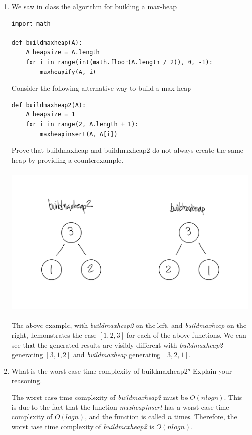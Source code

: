\documentclass[12pt,letterpaper]{article}
\begin{document}
\begin{enumerate}
    \item We saw in class the algorithm for building a max-heap

     \begin{lstlisting}[style = Python]
import math

def buildmaxheap(A):
    A.heapsize = A.length
    for i in range(int(math.floor(A.length / 2)), 0, -1):
        maxheapify(A, i)
    \end{lstlisting}

Consider the following alternative way to build a max-heap

     \begin{lstlisting}[style = Python]
def buildmaxheap2(A):
    A.heapsize = 1
    for i in range(2, A.length + 1):
        maxheapinsert(A, A[i])
    \end{lstlisting}

    Prove that buildmaxheap and buildmaxheap2 do not always create the same heap by providing a counterexample.

    \begin{center}
        \includegraphics[height=7.5cm]{heaps.jpeg}
    \end{center}

    The above example, with \textit{buildmaxheap2} on the left, and \textit{buildmaxheap} on the right, demonstrates the case $\left[1, 2, 3\right]$ for each of the above functions. We can see that the generated results are visibly different with \textit{buildmaxheap2} generating $\left[3, 1, 2\right]$ and \textit{buildmaxheap} generating $\left[3, 2, 1\right]$.

    \item What is the worst case time complexity of buildmaxheap2? Explain your reasoning.
    \vspace{0.15cm}

    The worst case time complexity of \textit{buildmaxheap2} must be $O(nlogn)$. This is due to the fact that the function \textit{maxheapinsert} has a worst case time complexity of $O(logn)$, and the function is called $n$ times. Therefore, the worst case time complexity of \textit{buildmaxheap2} is $O(nlogn)$.
\end{enumerate}
\end{document}
